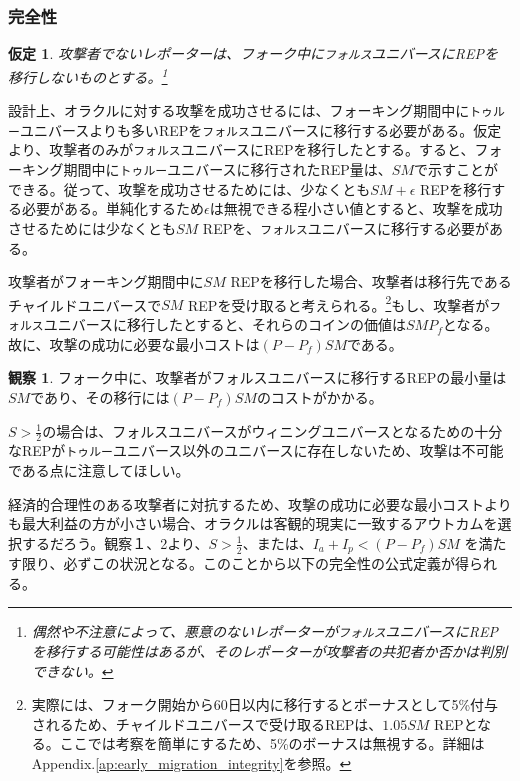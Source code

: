 \documentclass[floatfix,reprint,nofootinbib,amsmath,amssymb,epsfig,pre,floats,letterpaper,groupedaffiliation]{revtex4-1}
\newtheorem{assumption}{仮定}
\theoremstyle{definition}
\newtheorem{observation}{観察}
\theoremstyle{definition}
\theoremstyle{definition}
\begin{document}
\subsubsection{完全性}

\begin{assumption}
攻撃者でないレポーターは、フォーク中に\texttt{フォルス}ユニバースにREPを移行しないものとする。\footnote{偶然や不注意によって、悪意のないレポーターが\texttt{フォルス}ユニバースにREPを移行する可能性はあるが、そのレポーターが攻撃者の共犯者か否かは判別できない。}
\end{assumption}

設計上、オラクルに対する攻撃を成功させるには、フォーキング期間中に\texttt{トゥルー}ユニバースよりも多いREPを\texttt{フォルス}ユニバースに移行する必要がある。仮定より、攻撃者のみが\texttt{フォルス}ユニバースにREPを移行したとする。すると、フォーキング期間中に\texttt{トゥルー}ユニバースに移行されたREP量は、$SM$で示すことができる。従って、攻撃を成功させるためには、少なくとも$SM + \epsilon$ REPを移行する必要がある。単純化するため$\epsilon$は無視できる程小さい値とすると、攻撃を成功させるためには少なくとも$SM$ REPを、\texttt{フォルス}ユニバースに移行する必要がある。

攻撃者がフォーキング期間中に$SM$ REPを移行した場合、攻撃者は移行先であるチャイルドユニバースで$SM$ REPを受け取ると考えられる。\footnote{実際には、フォーク開始から60日以内に移行するとボーナスとして5\%付与されるため、チャイルドユニバースで受け取るREPは、$1.05 SM$ REPとなる。ここでは考察を簡単にするため、5\%のボーナスは無視する。詳細はAppendix.\ref{ap:early_migration_integrity}を参照。}もし、攻撃者が\texttt{フォルス}ユニバースに移行したとすると、それらのコインの価値は$SMP_f$となる。故に、攻撃の成功に必要な最小コストは$(P - P_f)SM$である。


\begin{observation}
フォーク中に、攻撃者がフォルスユニバースに移行するREPの最小量は$SM$であり、その移行には$(P - P_f)SM$のコストがかかる。
\end{observation}

$S > \frac{1}{2}$の場合は、フォルスユニバースがウィニングユニバースとなるための十分なREPが\texttt{トゥルー}ユニバース以外のユニバースに存在しないため、攻撃は不可能である点に注意してほしい。

経済的合理性のある攻撃者に対抗するため、攻撃の成功に必要な最小コストよりも最大利益の方が小さい場合、オラクルは客観的現実に一致するアウトカムを選択するだろう。観察１、2より、$S > \frac{1}{2}$、または、$I_a + I_p < (P - P_f)SM$ を満たす限り、必ずこの状況となる。このことから以下の完全性の公式定義が得られる。
\end{document}
